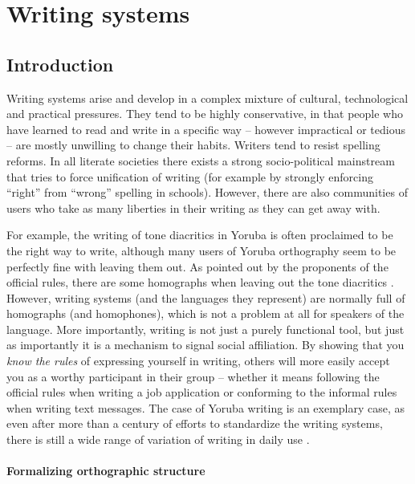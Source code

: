 \chapter{Writing systems}
\label{writing_systems}

\section{Introduction}
\label{introduction}

Writing systems arise and develop in a complex mixture of cultural,
technological and practical pressures. They tend to be highly conservative, in
that people who have learned to read and write in a specific way -- however
impractical or tedious -- are mostly unwilling to change their habits. Writers
tend to resist spelling reforms. In all literate societies there exists a strong
socio-political mainstream that tries to force unification of writing (for
example by strongly enforcing ``right'' from ``wrong'' spelling in schools).
However, there are also communities of users who take as many liberties in
their writing as they can get away with.

For example, the writing of tone diacritics in Yoruba is often proclaimed to be
the right way to write, although many users of Yoruba orthography seem to be
perfectly fine with leaving them out. As pointed out by the proponents of the
official rules, there are some homographs when leaving out the tone diacritics
\citep[44]{Olumuyiw2013}. However, writing systems (and the languages they
represent) are normally full of homographs (and homophones), which is 
not a problem at all for speakers of the language. More importantly, writing is
not just a purely functional tool, but just as importantly it is a mechanism to
signal social affiliation. By showing that you \textit{know the rules} of
expressing yourself in writing, others will more easily accept you as a worthy
participant in their group -- whether it means following the official rules 
when writing a job application or conforming to the informal rules when writing text 
messages. The case of Yoruba writing is
an exemplary case, as even after more than a century of efforts to standardize
the writing systems, there is still a wide range of variation of writing in
daily use \citep{Olumuyiw2013}.

\subsubsection*{Formalizing orthographic structure}

